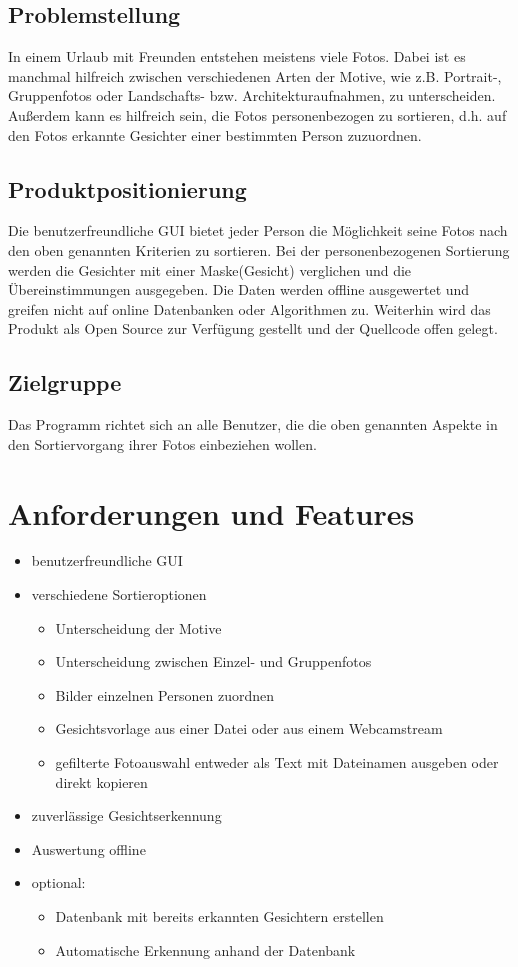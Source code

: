 \documentclass[
10pt, %
a4paper, %
oneside, %
headinclude,footinclude, %
BCOR5mm, %
]{scrartcl}
\begin{document}
\subsection{Problemstellung}
In einem Urlaub mit Freunden entstehen meistens viele Fotos. Dabei ist es manchmal hilfreich zwischen verschiedenen Arten der Motive, wie z.B. Portrait-, Gruppenfotos oder Landschafts- bzw. Architekturaufnahmen, zu unterscheiden. Außerdem kann es hilfreich sein, die Fotos personenbezogen zu sortieren, d.h. auf den Fotos erkannte Gesichter einer bestimmten Person zuzuordnen. 

\subsection{Produktpositionierung}
Die benutzerfreundliche GUI bietet jeder Person die Möglichkeit seine Fotos nach den oben genannten Kriterien zu sortieren. Bei der personenbezogenen Sortierung werden die Gesichter mit einer Maske(Gesicht) verglichen und die Übereinstimmungen ausgegeben. Die Daten werden offline ausgewertet und greifen nicht auf online Datenbanken oder Algorithmen zu. Weiterhin wird das Produkt als Open Source zur Verfügung gestellt und der Quellcode offen gelegt.

\subsection{Zielgruppe}
Das Programm richtet sich an alle Benutzer, die die oben genannten Aspekte in den Sortiervorgang ihrer Fotos einbeziehen wollen.

\section{Anforderungen und Features}
\begin{itemize}
\item benutzerfreundliche GUI
\item verschiedene Sortieroptionen
\begin{itemize}
\item Unterscheidung der Motive
\item Unterscheidung zwischen Einzel- und Gruppenfotos
\item Bilder einzelnen Personen zuordnen
\item Gesichtsvorlage aus einer Datei oder aus einem Webcamstream
\item gefilterte Fotoauswahl entweder als Text mit Dateinamen ausgeben oder direkt kopieren
\end{itemize}
\item zuverlässige Gesichtserkennung
\item Auswertung offline
\item optional:
\begin{itemize}
\item Datenbank mit bereits erkannten Gesichtern erstellen
\item Automatische Erkennung anhand der Datenbank
\end{itemize}
\end{itemize}
\end{document}
